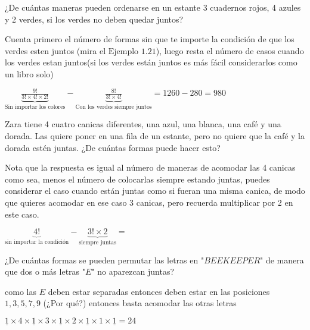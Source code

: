 \documentclass[11pt]{scrartcl}
\begin{document}
\begin{problem}
    ¿De cuántas maneras pueden ordenarse en un
    estante 3 cuadernos rojos, 4 azules y 2 verdes, si los verdes no deben
    quedar juntos?
   \begin{hint}
Cuenta primero el número de formas sin que te importe la condición de que los verdes esten juntos (mira el $\hyperref[ejemplo_cuadernos]{\text{Ejemplo 1.21}}$), luego resta el número de casos cuando los verdes estan juntos(si los verdes están juntos es más fácil considerarlos como un libro solo)
   \end{hint}
   \begin{answer}
       $\underbrace{\frac{9!}{3!\times 4!\times 2!}}_{\text{Sin importar los colores}}-\underbrace{\frac{8!}{3!\times 4!}}_{\text{Con los verdes siempre juntos}}=1260-280=980$
   \end{answer}
\end{problem}
\vspace{0.1cm}
\begin{problem}
       Zara tiene 4 cuatro canicas diferentes, una azul, una blanca, una café y una dorada. Las quiere poner en una fila de un estante, pero no quiere que la café y la dorada estén juntas. ¿De cuántas formas puede hacer esto?
       \begin{hint}
           Nota que la respuesta es igual al número de maneras de acomodar las 4 canicas como sea, menos el número de colocarlas siempre estando juntas, puedes considerar el caso cuando están juntas como si fueran una misma canica, de modo que quieres acomodar en ese caso 3 canicas, pero recuerda multiplicar por 2 en este caso.
       \end{hint}
       \begin{answer}
           $\underbrace{4!}_{\text{sin importar la condición}}-\underbrace{3!\times 2}_{\text{siempre juntas}}=$
       \end{answer}
   \end{problem}
   \vspace{0.1cm}
\begin{problem}
¿De cuántas formas se pueden permutar las letras en "$BEEKEEPER$" de manera que dos o más letras "$E$" no aparezcan juntas?
\begin{hint}
    como las $E$ deben estar separadas entonces deben estar en las posiciones $1,3,5,7,9$ (¿Por qué?) entonces basta acomodar las otras letras 
\end{hint}
\begin{answer}
    $\underline{1} \times \boxed{4} \times \underline{1}\times \boxed{3} \times \underline{1}\times \boxed{2}\times \underline{1}\times \boxed{1}\times \underline{1}=24$
\end{answer}
\end{problem}
\end{document}

